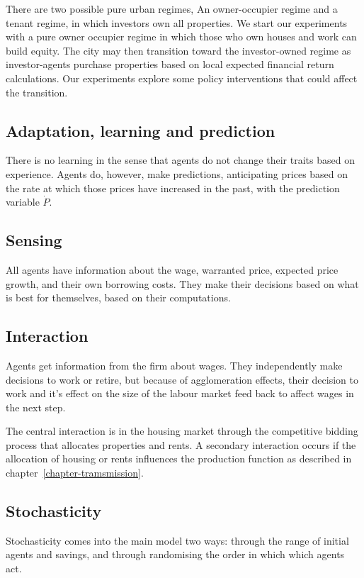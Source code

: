 There are two possible pure urban regimes, An owner-occupier regime and a tenant regime, in which investors own all properties. We start our experiments with a pure owner occupier regime in which those who own houses and work can build equity.  The city may then transition toward the investor-owned regime as investor-agents purchase properties based on local expected financial return calculations. Our experiments explore some policy interventions that could affect the transition.


\subsection{Adaptation, learning and prediction}
There is no learning in the sense that agents do not change their traits based on experience. 
Agents do, however, make predictions, anticipating prices based on the rate at which those prices have increased in the past, with the prediction variable $\dot P$.

\subsection{Sensing}
All agents have information about the wage, warranted price, expected price growth, and their own borrowing costs. They make their decisions based on what is best for themselves, based on their computations. 

\subsection{Interaction}
Agents get information from the firm about wages. They independently make decisions to work or retire, but because of agglomeration effects, their decision to work and it's effect on the size of the labour market feed back to affect wages in the next step. 

The central interaction  is in the housing market through the competitive bidding process that allocates properties and rents.  A secondary interaction occurs if the allocation of housing or rents influences the production function as described in chapter~\ref{chapter-tramsmission}.

\subsection{Stochasticity}
Stochasticity comes into the main model two ways: through the range of initial agents and savings, and through randomising the order in which which agents act. 

